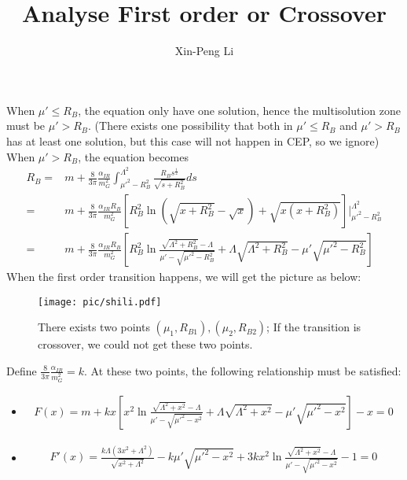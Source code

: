 \documentclass{article}
\title{Analyse First order or Crossover}
\author{Xin-Peng Li}
\begin{document}
\maketitle
When $\mu'\leq R_B$, the equation only have one solution, hence the multisolution zone must be $\mu'>R_B$. (There exists one possibility that both in $\mu'\leq R_B$ and $\mu'>R_B$ has at least one solution, but this case will not happen in CEP, so we ignore)
When $\mu'>R_B$, the equation becomes
\begin{equation}
    \begin{split}
    R_B=&m+\frac{8}{3\pi}\frac{\alpha_{IR}}{m_G^2}\int_{\mu'^2-R_B^2}^{\Lambda^2}\frac{R_Bs^{\frac{1}{2}}}{\sqrt{s+R_B^2}}ds\\
        =&m+\frac{8}{3\pi}\frac{\alpha_{IR}R_B}{m_G^2}\left[R_B^2\ln(\sqrt{x+R_B^2}-\sqrt{x})+\sqrt{x(x+R_B^2)}\right]|_{\mu'^2-R_B^2}^{\Lambda^2}\\
        =&m+\frac{8}{3\pi}\frac{\alpha_{IR}R_B}{m_G^2}\left[R_B^2\ln\frac{\sqrt{\Lambda^2+R_B^2}-\Lambda}{\mu'-\sqrt{\mu'^2-R_B^2}}+\Lambda\sqrt{\Lambda^2+R_B^2}-\mu'\sqrt{\mu'^2-R_B^2}\right]
    \end{split}
\end{equation}
When the first order transition happens, we will get the picture as below:
\begin{figure}[H]
    \centering
    \texttt{[image: pic/shili.pdf]}
    \caption{There exists two points $(\mu_1,R_{B1}),(\mu_2,R_{B2})$; If the transition is crossover, we could not get these two points.}
\end{figure}
Define $\frac{8}{3\pi}\frac{\alpha_{IR}}{m_G^2}=k$. At these two points, the following relationship must be satisfied:
\begin{itemize}
    \item 
    \begin{equation}
        \begin{split}
            F(x)=m+kx\left[x^2\ln\frac{\sqrt{\Lambda^2+x^2}-\Lambda}{\mu'-\sqrt{\mu'^2-x^2}}+\Lambda\sqrt{\Lambda^2+x^2}-\mu'\sqrt{\mu'^2-x^2}\right]-x=0
        \end{split}
    \end{equation}
    \item 
    \begin{equation}\label{F'}
        \begin{split}
            F'(x)=\frac{k\Lambda(3x^2+\Lambda^2)}{\sqrt{x^2+\Lambda^2}}-k\mu'\sqrt{\mu'^2-x^2}+3kx^2\ln\frac{\sqrt{\Lambda^2+x^2}-\Lambda}{\mu'-\sqrt{\mu'^2-x^2}}-1=0
        \end{split}
    \end{equation}
\end{itemize}
\end{document}
